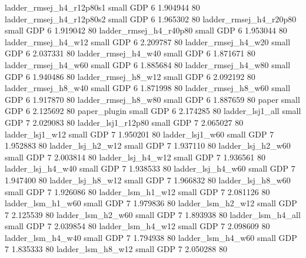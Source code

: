 ladder_rmsej_h4_r12p80s1      small      GDP                 6 1.904944 80
ladder_rmsej_h4_r12p80s2      small      GDP                 6 1.965302 80
  ladder_rmsej_h4_r20p80      small      GDP                 6 1.919042 80
  ladder_rmsej_h4_r40p80      small      GDP                 6 1.953044 80
     ladder_rmsej_h4_w12      small      GDP                 6 2.209787 80
     ladder_rmsej_h4_w20      small      GDP                 6 2.037331 80
     ladder_rmsej_h4_w40      small      GDP                 6 1.871671 80
     ladder_rmsej_h4_w60      small      GDP                 6 1.885684 80
     ladder_rmsej_h4_w80      small      GDP                 6 1.940486 80
     ladder_rmsej_h8_w12      small      GDP                 6 2.092192 80
     ladder_rmsej_h8_w40      small      GDP                 6 1.871998 80
     ladder_rmsej_h8_w60      small      GDP                 6 1.917870 80
     ladder_rmsej_h8_w80      small      GDP                 6 1.887659 80
                   paper      small      GDP                 6 2.125692 80
            paper_plugin      small      GDP                 6 2.174285 80
         ladder_lsj1_all      small      GDP                 7 2.029083 80
      ladder_lsj1_r12p80      small      GDP                 7 2.065027 80
         ladder_lsj1_w12      small      GDP                 7 1.950201 80
         ladder_lsj1_w60      small      GDP                 7 1.952883 80
       ladder_lsj_h2_w12      small      GDP                 7 1.937110 80
       ladder_lsj_h2_w60      small      GDP                 7 2.003814 80
       ladder_lsj_h4_w12      small      GDP                 7 1.936561 80
       ladder_lsj_h4_w40      small      GDP                 7 1.938533 80
       ladder_lsj_h4_w60      small      GDP                 7 1.947400 80
       ladder_lsj_h8_w12      small      GDP                 7 1.966832 80
       ladder_lsj_h8_w60      small      GDP                 7 1.926086 80
       ladder_lsm_h1_w12      small      GDP                 7 2.081126 80
       ladder_lsm_h1_w60      small      GDP                 7 1.979836 80
       ladder_lsm_h2_w12      small      GDP                 7 2.125539 80
       ladder_lsm_h2_w60      small      GDP                 7 1.893938 80
       ladder_lsm_h4_all      small      GDP                 7 2.039854 80
       ladder_lsm_h4_w12      small      GDP                 7 2.098609 80
       ladder_lsm_h4_w40      small      GDP                 7 1.794938 80
       ladder_lsm_h4_w60      small      GDP                 7 1.835333 80
       ladder_lsm_h8_w12      small      GDP                 7 2.050288 80

